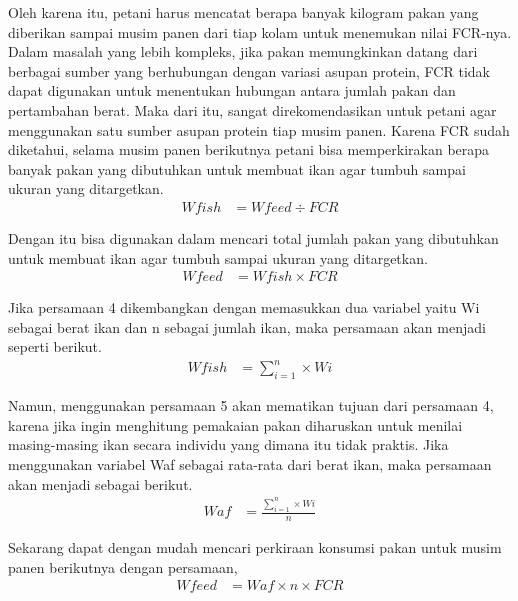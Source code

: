 Oleh karena itu, petani harus mencatat berapa banyak kilogram pakan yang diberikan sampai musim panen dari tiap kolam untuk menemukan nilai FCR-nya. Dalam masalah yang lebih kompleks, jika pakan memungkinkan datang dari berbagai sumber yang berhubungan dengan variasi asupan protein, FCR tidak dapat digunakan untuk menentukan hubungan antara jumlah pakan dan pertambahan berat.  Maka dari itu, sangat direkomendasikan untuk petani agar menggunakan satu sumber asupan protein tiap musim panen. Karena FCR sudah diketahui, selama musim panen berikutnya petani bisa memperkirakan berapa banyak pakan yang dibutuhkan untuk membuat ikan agar tumbuh sampai ukuran yang ditargetkan.
\begin{equation}
    \begin{split}
		Wfish
		&= Wfeed \div FCR
    \end{split}
\end{equation}

Dengan itu bisa digunakan dalam mencari total jumlah pakan yang dibutuhkan untuk membuat ikan agar tumbuh sampai ukuran yang ditargetkan. 
\begin{equation}
    \begin{split}
		Wfeed
		&= Wfish \times FCR
    \end{split}
\end{equation}

Jika persamaan 4 dikembangkan dengan memasukkan dua variabel yaitu Wi sebagai berat ikan dan n sebagai jumlah ikan, maka persamaan akan menjadi seperti berikut.
\begin{equation}
    \begin{split}
		Wfish
		&= \sum_{i=1}^n \times Wi
    \end{split}
\end{equation}

Namun, menggunakan persamaan 5 akan mematikan tujuan dari persamaan 4, karena jika ingin menghitung pemakaian pakan diharuskan untuk menilai masing-masing ikan secara individu yang dimana itu tidak praktis. Jika menggunakan variabel Waf sebagai rata-rata dari berat ikan, maka persamaan akan menjadi sebagai berikut.
\begin{equation}
    \begin{split}
		Waf
		&= \frac{\sum_{i=1}^n \times Wi}{n}
    \end{split}
\end{equation}

Sekarang dapat dengan mudah mencari perkiraan konsumsi pakan untuk musim panen berikutnya dengan persamaan,
\begin{equation}
    \begin{split}
		Wfeed
		&= Waf \times n \times FCR
    \end{split}
\end{equation}


